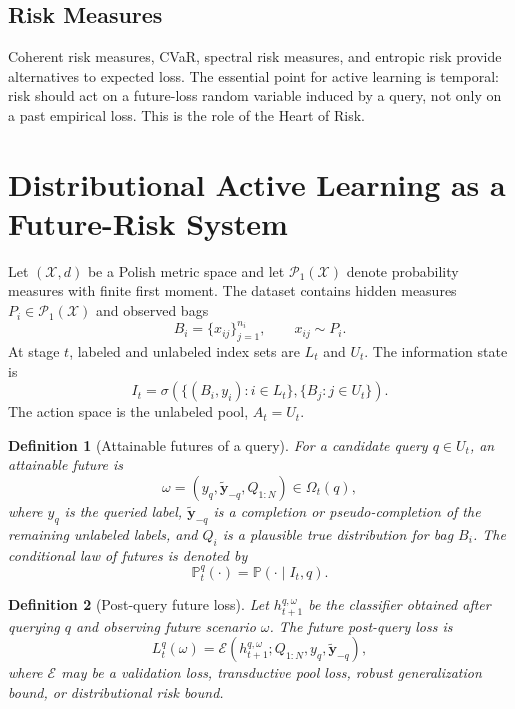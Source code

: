 \documentclass[10pt,journal]{IEEEtran}
\newtheorem{definition}{Definition}
\newcommand{\Prob}{\mathbb{P}}
\newcommand{\Pcal}{\mathcal{P}}
\newcommand{\Xcal}{\mathcal{X}}
\begin{document}
\subsection{Risk Measures}

Coherent risk measures, CVaR, spectral risk measures, and entropic risk provide alternatives to expected loss. The essential point for active learning is temporal: risk should act on a future-loss random variable induced by a query, not only on a past empirical loss. This is the role of the Heart of Risk.

\section{Distributional Active Learning as a Future-Risk System}
\label{sec:dal-heart-system}

Let $(\Xcal,d)$ be a Polish metric space and let $\Pcal_1(\Xcal)$ denote probability measures with finite first moment. The dataset contains hidden measures $P_i\in\Pcal_1(\Xcal)$ and observed bags
\begin{equation}
    B_i=\{x_{ij}\}_{j=1}^{n_i}, \qquad x_{ij}\sim P_i.
\end{equation}
At stage $t$, labeled and unlabeled index sets are $L_t$ and $U_t$. The information state is
\begin{equation}
    I_t=\sigma\!\left(\{(B_i,y_i):i\in L_t\},\{B_j:j\in U_t\}\right).
\end{equation}
The action space is the unlabeled pool, $A_t=U_t$.

\begin{definition}[Attainable futures of a query]
\label{def:attainable-future}
For a candidate query $q\in U_t$, an attainable future is
\begin{equation}
    \omega=(y_q,\tilde{\mathbf y}_{-q},Q_{1:N})\in\Omega_t(q),
\end{equation}
where $y_q$ is the queried label, $\tilde{\mathbf y}_{-q}$ is a completion or pseudo-completion of the remaining unlabeled labels, and $Q_i$ is a plausible true distribution for bag $B_i$. The conditional law of futures is denoted by
\begin{equation}
    \Prob_t^q(\cdot)=\Prob(\cdot\mid I_t,q).
\end{equation}
\end{definition}

\begin{definition}[Post-query future loss]
\label{def:post-query-loss}
Let $h_{t+1}^{q,\omega}$ be the classifier obtained after querying $q$ and observing future scenario $\omega$. The future post-query loss is
\begin{equation}
\label{eq:post-query-loss}
    L_t^q(\omega)=\mathcal E\!\left(h_{t+1}^{q,\omega};Q_{1:N},y_q,\tilde{\mathbf y}_{-q}\right),
\end{equation}
where $\mathcal E$ may be a validation loss, transductive pool loss, robust generalization bound, or distributional risk bound.
\end{definition}
\end{document}

